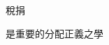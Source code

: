 
\thispagestyle{empty}

\begin{center}
稅捐

是重要的分配正義之學
\end{center}

\setlength{\abovedisplayskip}{-5pt}
\setlength{\abovedisplayshortskip}{-5pt}

